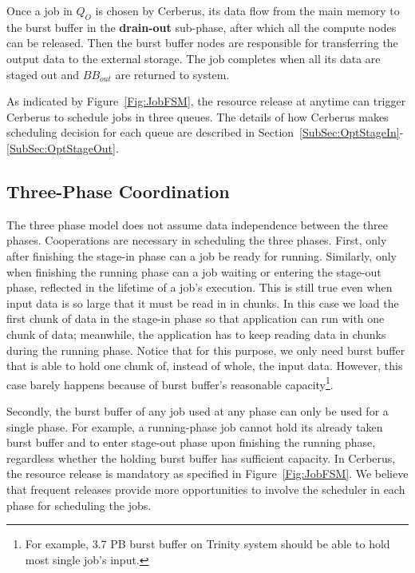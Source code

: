 Once a job in $Q_O$ is chosen by Cerberus, its data flow from the main memory to the burst buffer
in the \textbf{drain-out} sub-phase, after which all the compute nodes can be released.
Then the burst buffer nodes are responsible for transferring the output data to the external storage.
The job completes when all its data are staged out and $BB_{out}$ are returned to system.

As indicated by Figure~\ref{Fig:JobFSM}, the resource release at anytime can trigger Cerberus
to schedule jobs in three queues.
The details of how Cerberus makes scheduling decision for each queue are
described in Section~\ref{SubSec:OptStageIn}-\ref{SubSec:OptStageOut}.

\subsection{Three-Phase Coordination}
\label{SubSec:Coordination}
The three phase model does not assume data independence between the three phases.
Cooperations are necessary in scheduling the three phases.
First, only after finishing the stage-in phase can a job be ready for running.
Similarly, only when finishing the running phase can a job waiting or entering the stage-out phase,
reflected in the lifetime of a job's execution.
This is still true even when input data is so large that it must be read in in chunks.
In this case we load the first chunk of data in the stage-in phase so that application
can run with one chunk of data;
meanwhile, the application has to keep reading data in chunks during the running phase.
Notice that for this purpose, we only need burst buffer that is able to hold one chunk
of, instead of whole, the input data.
However, this case barely happens because of burst buffer's reasonable capacity\footnote{For
example, 3.7 PB burst buffer on Trinity system should be able to hold most single job's input.}.

Secondly, the burst buffer of any job used at any phase can only be used for a single phase.
For example, a running-phase job cannot hold its already taken burst buffer
and to enter stage-out phase upon finishing the running phase,
regardless whether the holding burst buffer has sufficient capacity.
In Cerberus, the resource release is mandatory as specified in Figure~\ref{Fig:JobFSM}.
We believe that frequent releases provide more opportunities to involve the scheduler in each phase for scheduling the jobs.

